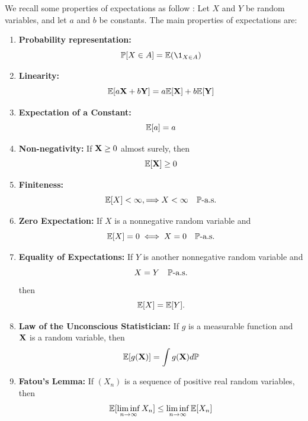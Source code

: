 \documentclass[../Main.tex]{subfiles}
\begin{document}
We recall some properties of expectations as follow :
Let \( X \) and \( Y \) be random variables, and let \( a \) and \( b \) be constants. The main properties of expectations are:
\begin{enumerate}
    \item \textbf{Probability representation:}
    \begin{equation*}
    \PP[X\in A] = \EE(\1_{X\in A})
    \end{equation*}

    \item \textbf{Linearity:}
    \begin{equation*}
    \mathbb{E}[a\mathbf{X}+ b\mathbf{Y}] = a\mathbb{E}[\mathbf{X}] + b\mathbb{E}[\mathbf{Y}]
    \end{equation*}

    \item \textbf{Expectation of a Constant:}
    \begin{equation*}
    \mathbb{E}[a] = a
    \end{equation*}

    \item \textbf{Non-negativity:}
    If \( \mathbf{X}\geq 0 \) almost surely, then
    \begin{equation*}
    \mathbb{E}[\mathbf{X}] \geq 0
    \end{equation*}

    \item \textbf{Finiteness:}
    \[ \mathbb{E}[X] < \infty, \Longrightarrow  X < \infty \quad \mathbb{P}\text{-a.s.} \]

    \item \textbf{Zero Expectation:}
    If \( X \) is a nonnegative random variable and
    \[ \mathbb{E}[X] = 0 \;\Longleftrightarrow\; X = 0 \quad \mathbb{P}\text{-a.s.} \]

    \item \textbf{Equality of Expectations:}
    If $Y$ is another nonnegative random variable and
    \[ X = Y \quad \mathbb{P}\text{-a.s.} \]
    then
    \[ \mathbb{E}[X] = \mathbb{E}[Y]. \]

    \item \textbf{Law of the Unconscious Statistician:}
    If \( g \) is a measurable function and \( \mathbf{X}\) is a random variable, then
    \begin{equation*}
    \mathbb{E}[g(\mathbf{X})] = \int g(\mathbf{X})d\mathbb{P} 
    \end{equation*}

    \item \textbf{Fatou's Lemma:}
    If \( (X_n) \) is a sequence of positive real random variables, then
    \begin{equation*}
    \mathbb{E}[\liminf_{n \to \infty} X_n] \leq \liminf_{n \to \infty} \mathbb{E}[X_n]
    \end{equation*}


\end{enumerate}
\end{document}
